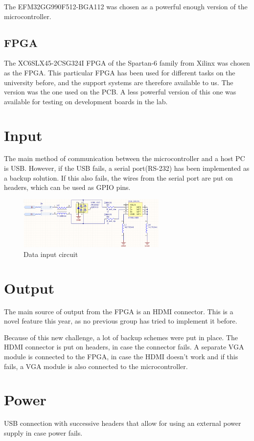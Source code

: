 \documentclass[../main/report.tex]{subfiles}
\begin{document}
The EFM32GG990F512-BGA112 was chosen as a powerful enough version of the microcontroller.

\subsection{FPGA}
The XC6SLX45-2CSG324I FPGA of the Spartan-6 family from Xilinx was chosen as the FPGA.
This particular FPGA has been used for different tasks on the university before, and the support systems are therefore available to us.
The version was the one used on the PCB.
A less powerful version of this one was available for testing on development boards in the lab.

\section{Input}

The main method of communication between the microcontroller and a host PC is USB.
However, if the USB fails, a serial port(RS-232) has been implemented as a backup solution.
If this also fails, the wires from the serial port are put on headers, which can be used as GPIO pins.

\begin{figure}[H]
	\centering
	\includegraphics[width=0.65\textwidth]{../pcb/assets/input.png}
	\caption{Data input circuit}
	\label{fig: input cicrcuit}
\end{figure}
\section{Output}
The main source of output from the FPGA is an HDMI connector.
This is a novel feature this year, as no previous group has tried to implement it before.

Because of this new challenge, a lot of backup schemes were put in place.
The HDMI connector is put on headers, in case the connector fails.
A separate VGA module is connected to the FPGA, in case the HDMI doesn't work and if this fails, a VGA module is also connected to the microcontroller.

\section{Power}
USB connection with successive headers that allow for using an external power supply in case power fails.
\end{document}
